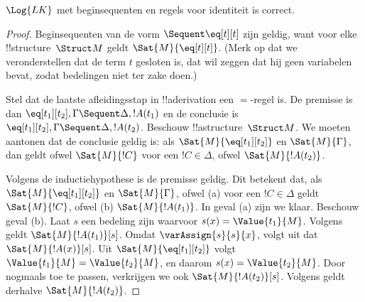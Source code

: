 \documentclass[../../../include/open-logic-section]{subfiles}
\begin{document}


\begin{prop}
$\Log{LK}$ met beginsequenten en regels voor identiteit is correct.
\end{prop}

\begin{proof}
Beginsequenten van de vorm ${} \Sequent \eq[t][t]$ zijn geldig, want
voor elke !!{structure}~$\Struct M$ geldt $\Sat{M}{\eq[t][t]}$. (Merk
op dat we veronderstellen dat de term $t$ gesloten is, dat wil zeggen
dat hij geen variabelen bevat, zodat bedelingen niet ter zake doen.)

Stel dat de laatste afleidingsstap in !!a{derivation} een $=$-regel is.
De premisse is dan $\eq[t_1][t_2], \Gamma \Sequent \Delta, !A(t_1)$
en de conclusie is $\eq[t_1][t_2], \Gamma \Sequent \Delta, !A(t_2)$.
Beschouw !!a{structure}~$\Struct M$. We moeten aantonen dat de conclusie
geldig is: als $\Sat{M}{\eq[t_1][t_2]}$ en $\Sat{M}{\Gamma}$, dan geldt
ofwel $\Sat{M}{!C}$ voor een $!C \in \Delta$, ofwel
$\Sat{M}{!A(t_2)}$.

Volgens de inductiehypothese is de premisse geldig. Dit betekent dat,
als $\Sat{M}{\eq[t_1][t_2]}$ en $\Sat{M}{\Gamma}$, ofwel (a) voor een
$!C \in \Delta$ geldt $\Sat{M}{!C}$, ofwel (b)
$\Sat{M}{!A(t_1)}$. In geval (a) zijn we klaar. Beschouw geval (b).
Laat $s$ een bedeling zijn waarvoor $s(x) = \Value{t_1}{M}$. Volgens
 geldt
$\Sat{M}{!A(t_1)}[s]$. Omdat $\varAssign{s}{s}{x}$, volgt uit
 dat $\Sat{M}{!A(x)}[s]$. Uit
$\Sat{M}{\eq[t_1][t_2]}$ volgt $\Value{t_1}{M} = \Value{t_2}{M}$, en
daarom $s(x) = \Value{t_2}{M}$. Door
 nogmaals toe te passen, verkrijgen
we ook $\Sat{M}{!A(t_2)}[s]$. Volgens
 geldt derhalve
$\Sat{M}{!A(t_2)}$.
\end{proof}
\end{document}
